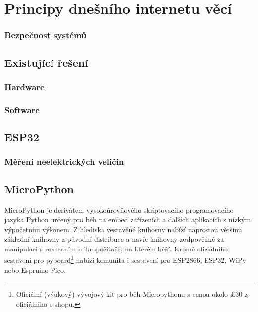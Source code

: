 \chapter{Principy dnešního internetu věcí}
\label{ch:principy-iot}




\subsection{Bezpečnost systémů}


\section{Existující řešení}
\subsection{Hardware}

\subsection{Software}

\section{ESP32}

\subsection{Měření neelektrických veličin}

\section{MicroPython}
MicroPython je derivátem vysokoúrovňového skriptovacího programovacího jazyka Python určený pro běh na embed zařízeních a dalších
aplikacích s nízkým výpočetním výkonem. Z hlediska vestavěné knihovny nabízí naprostou většinu základní knihovny z původní
distribuce a navíc knihovny zodpovědné za manipulaci s rozhraním mikropočítače, na kterém běží. Kromě oficiálního sestavení
pro pyboard\footnote{Oficiální (výukový) vývojový kit pro běh Micropythonu s cenou okolo \pounds30 z oficiálního e-shopu.}
nabízí komunita i sestavení pro ESP2866, ESP32, WiPy nebo Espruino Pico.


